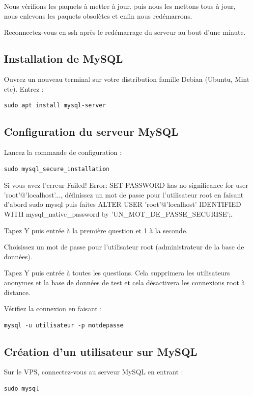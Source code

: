 \documentclass{article}
\begin{document}
Nous vérifions les paquets à mettre à jour, puis nous les mettons tous à jour, nous enlevons les paquets obsolètes et enfin nous redémarrons.

Reconnectez-vous en ssh après le redémarrage du serveur au bout d'une minute.

\subsection{Installation de MySQL}
Ouvrez un nouveau terminal sur votre distribution famille Debian (Ubuntu, Mint etc). Entrez :
\begin{verbatim}
sudo apt install mysql-server
\end{verbatim}

\subsection{Configuration du serveur MySQL}
Lancez la commande de configuration :
\begin{verbatim}
sudo mysql_secure_installation
\end{verbatim}
Si vous avez l'erreur Failed! Error: SET PASSWORD has no significance for user 'root'@'localhost'..., définissez un mot de passe pour l'utilisateur root en faisant d'abord sudo mysql puis faites ALTER USER 'root'@'localhost' IDENTIFIED WITH mysql\_native\_password by 'UN\_MOT\_DE\_PASSE\_SECURISE';.

Tapez Y puis entrée à la première question et 1 à la seconde.

Choisissez un mot de passe pour l'utilisateur root (administrateur de la base de données).

Tapez Y puis entrée à toutes les questions. Cela supprimera les utilisateurs anonymes et la base de données de test et cela désactivera les connexions root à distance.

Vérifiez la connexion en faisant :
\begin{verbatim}
mysql -u utilisateur -p motdepasse
\end{verbatim}

\subsection{Création d'un utilisateur sur MySQL}
Sur le VPS, connectez-vous au serveur MySQL en entrant :
\begin{verbatim}
sudo mysql
\end{verbatim}
\end{document}
